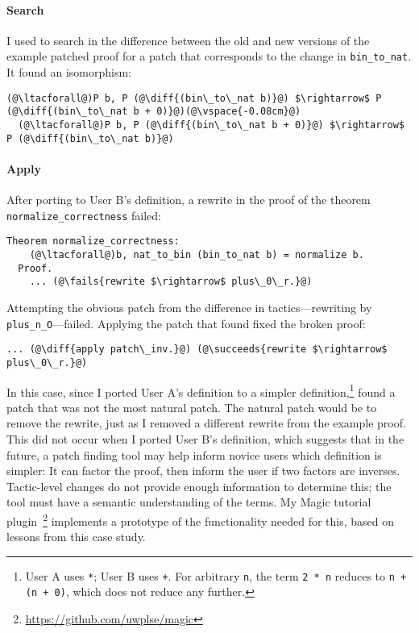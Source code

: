 \paragraph{Search} I used \sysname to search in the difference between the old and new versions of the example
patched proof for a patch that corresponds to the change in \lstinline{bin_to_nat}.
It found an isomorphism:

\begin{lstlisting}[language=coq]
  (@\ltacforall@)P b, P (@\diff{(bin\_to\_nat b)}@) $\rightarrow$ P (@\diff{(bin\_to\_nat b + 0)}@)(@\vspace{-0.08cm}@)
  (@\ltacforall@)P b, P (@\diff{(bin\_to\_nat b + 0)}@) $\rightarrow$ P (@\diff{(bin\_to\_nat b)}@)
\end{lstlisting}

\paragraph{Apply} After porting to User B's definition, a rewrite in the proof of the theorem
\lstinline{normalize_correctness} failed:

\begin{lstlisting}[language=coq]
  Theorem normalize_correctness:
    (@\ltacforall@)b, nat_to_bin (bin_to_nat b) = normalize b.
  Proof.
    ... (@\fails{rewrite $\rightarrow$ plus\_0\_r.}@)
\end{lstlisting}
Attempting the obvious patch from the difference in tactics---rewriting by \lstinline{plus_n_O}---failed.
Applying the patch that \sysname found fixed the broken proof:

\begin{lstlisting}[language=coq]
   ... (@\diff{apply patch\_inv.}@) (@\succeeds{rewrite $\rightarrow$ plus\_0\_r.}@)
\end{lstlisting}

In this case, since I ported User A's definition to a simpler 
definition,\footnote{User A uses \lstinline{*}; User B uses \lstinline{+}. 
For arbitrary \lstinline{n}, the term \lstinline{2 * n} reduces to \lstinline{n + (n + 0)}, which does not reduce any further.}
\sysname found a patch that was not the most natural patch.
The natural patch would be to remove the rewrite, just as I removed a different rewrite from the example proof.
This did not occur when I ported User B's definition,
which suggests that in the future, a patch finding tool may help inform novice users which definition is simpler:
It can factor the proof,  
then inform the user if two factors are inverses.
Tactic-level changes do not provide enough information to determine this; the tool must have a semantic
understanding of the terms.
My Magic tutorial plugin~\footnote{\url{https://github.com/uwplse/magic}} %
implements a prototype of the functionality needed for this, based on lessons from this case study.

